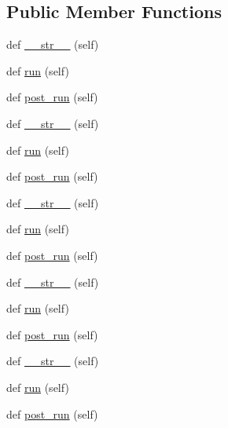 \subsection*{Public Member Functions}
\begin{DoxyCompactItemize}
\item 
def \hyperlink{classwaflib_1_1_tools_1_1javaw_1_1javadoc_a2f1356ecf27f8572372812c5845e80be}{\+\_\+\+\_\+str\+\_\+\+\_\+} (self)
\item 
def \hyperlink{classwaflib_1_1_tools_1_1javaw_1_1javadoc_a103375c9f988767d62ef76fda6c01a84}{run} (self)
\item 
def \hyperlink{classwaflib_1_1_tools_1_1javaw_1_1javadoc_a2ad51f7e57fa5a5d8c7834e9f8bd7ead}{post\+\_\+run} (self)
\item 
def \hyperlink{classwaflib_1_1_tools_1_1javaw_1_1javadoc_a2f1356ecf27f8572372812c5845e80be}{\+\_\+\+\_\+str\+\_\+\+\_\+} (self)
\item 
def \hyperlink{classwaflib_1_1_tools_1_1javaw_1_1javadoc_a103375c9f988767d62ef76fda6c01a84}{run} (self)
\item 
def \hyperlink{classwaflib_1_1_tools_1_1javaw_1_1javadoc_a2ad51f7e57fa5a5d8c7834e9f8bd7ead}{post\+\_\+run} (self)
\item 
def \hyperlink{classwaflib_1_1_tools_1_1javaw_1_1javadoc_a2f1356ecf27f8572372812c5845e80be}{\+\_\+\+\_\+str\+\_\+\+\_\+} (self)
\item 
def \hyperlink{classwaflib_1_1_tools_1_1javaw_1_1javadoc_a103375c9f988767d62ef76fda6c01a84}{run} (self)
\item 
def \hyperlink{classwaflib_1_1_tools_1_1javaw_1_1javadoc_a2ad51f7e57fa5a5d8c7834e9f8bd7ead}{post\+\_\+run} (self)
\item 
def \hyperlink{classwaflib_1_1_tools_1_1javaw_1_1javadoc_a2f1356ecf27f8572372812c5845e80be}{\+\_\+\+\_\+str\+\_\+\+\_\+} (self)
\item 
def \hyperlink{classwaflib_1_1_tools_1_1javaw_1_1javadoc_a103375c9f988767d62ef76fda6c01a84}{run} (self)
\item 
def \hyperlink{classwaflib_1_1_tools_1_1javaw_1_1javadoc_a2ad51f7e57fa5a5d8c7834e9f8bd7ead}{post\+\_\+run} (self)
\item 
def \hyperlink{classwaflib_1_1_tools_1_1javaw_1_1javadoc_a2f1356ecf27f8572372812c5845e80be}{\+\_\+\+\_\+str\+\_\+\+\_\+} (self)
\item 
def \hyperlink{classwaflib_1_1_tools_1_1javaw_1_1javadoc_a103375c9f988767d62ef76fda6c01a84}{run} (self)
\item 
def \hyperlink{classwaflib_1_1_tools_1_1javaw_1_1javadoc_a2ad51f7e57fa5a5d8c7834e9f8bd7ead}{post\+\_\+run} (self)

\end{DoxyCompactItemize}
